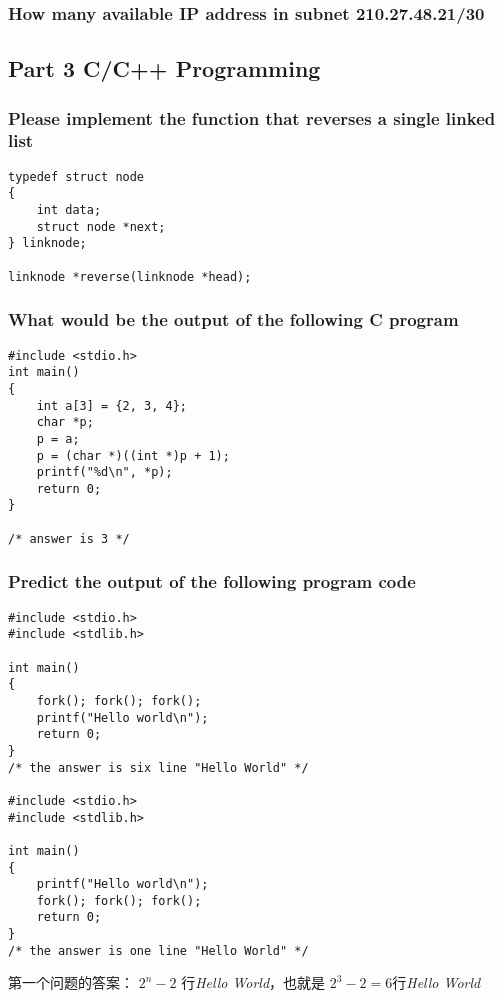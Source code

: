 \documentclass{article}
\begin{document}
\subsubsection{How many available IP address in subnet 210.27.48.21/30}

\subsection{Part 3 C/C++ Programming}

\subsubsection{Please implement the function that reverses a single linked list}
\begin{verbatim}
typedef struct node
{
	int data;
	struct node *next;
} linknode;

linknode *reverse(linknode *head);
\end{verbatim}

\subsubsection{What would be the output of the following C program}
\begin{verbatim}
#include <stdio.h>
int main()
{
	int a[3] = {2, 3, 4};
	char *p;
	p = a;
	p = (char *)((int *)p + 1);
	printf("%d\n", *p);
	return 0;
}

/* answer is 3 */
\end{verbatim}

\subsubsection{Predict the output of the following program code}
\begin{verbatim}
#include <stdio.h>
#include <stdlib.h>

int main()
{
	fork(); fork(); fork();
	printf("Hello world\n");
	return 0;
}
/* the answer is six line "Hello World" */

#include <stdio.h>
#include <stdlib.h>

int main()
{
	printf("Hello world\n");
	fork(); fork(); fork();
	return 0;
}
/* the answer is one line "Hello World" */

\end{verbatim}

第一个问题的答案： $ 2^n - 2 $ 行\textit{Hello World}，也就是 $ 2^3 -2 = 6 $行\textit{Hello World}
\end{document}
